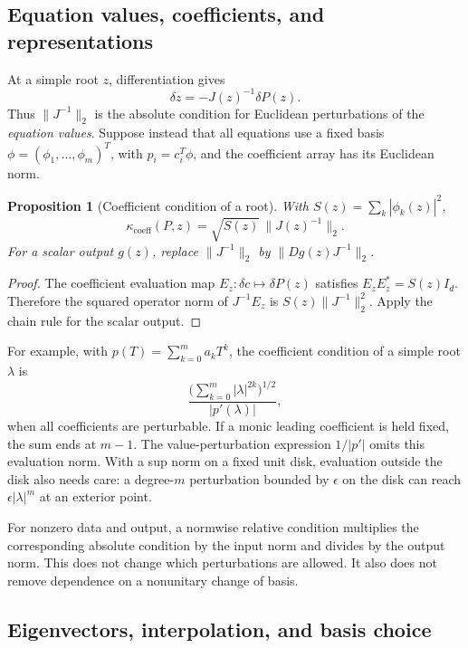 \documentclass[12pt]{article}
\newtheorem{proposition}[theorem]{Proposition}
\theoremstyle{definition}
\theoremstyle{remark}
\begin{document}
\subsection{Equation values, coefficients, and representations}

At a simple root $z$, differentiation gives
\begin{equation}\label{eq:root-derivative}
  \delta z=-J(z)^{-1}\delta P(z).
\end{equation}
Thus $\|J^{-1}\|_2$ is the absolute condition for Euclidean perturbations of the
\emph{equation values}. Suppose instead that all equations use a fixed basis
$\phi=(\phi_1,\ldots,\phi_m)^T$, with $p_i=c_i^T\phi$, and the coefficient
array has its Euclidean norm.

\begin{proposition}[Coefficient condition of a root]\label{prop:coeff-condition}
With $S(z)=\sum_k|\phi_k(z)|^2$,
\[
  \kappa_{\mathrm{coeff}}(P,z)=\sqrt{S(z)}\,\|J(z)^{-1}\|_2.
\]
For a scalar output $g(z)$, replace $\|J^{-1}\|_2$ by $\|Dg(z)J^{-1}\|_2$.
\end{proposition}

\begin{proof}
The coefficient evaluation map $E_z:\delta c\mapsto\delta P(z)$ satisfies
$E_zE_z^*=S(z)I_d$. Therefore the squared operator norm of $J^{-1}E_z$ is
$S(z)\|J^{-1}\|_2^2$. Apply the chain rule for the scalar output.
\end{proof}

For example, with $p(T)=\sum_{k=0}^m a_kT^k$, the coefficient condition of a
simple root $\lambda$ is
\[
  \frac{\bigl(\sum_{k=0}^m|\lambda|^{2k}\bigr)^{1/2}}{|p'(\lambda)|},
\]
when all coefficients are perturbable. If a monic leading coefficient is held
fixed, the sum ends at $m-1$. The value-perturbation expression $1/|p'|$ omits
this evaluation norm. With a sup norm on a fixed unit disk, evaluation outside
the disk also needs care: a degree-$m$ perturbation bounded by $\epsilon$ on the
disk can reach $\epsilon|\lambda|^m$ at an exterior point.

For nonzero data and output, a normwise relative condition multiplies the
corresponding absolute condition by the input norm and divides by the output
norm. This does not change which perturbations are allowed. It also does not
remove dependence on a nonunitary change of basis.

\subsection{Eigenvectors, interpolation, and basis choice}
\end{document}
